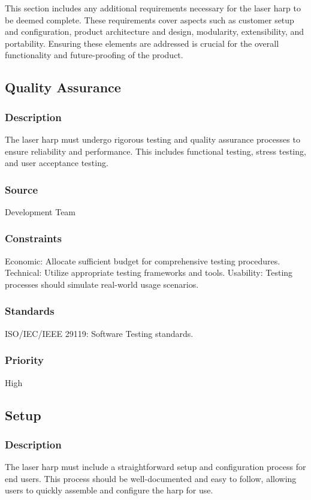 This section includes any additional requirements necessary for the laser harp to be deemed complete. These requirements cover aspects such as customer setup and configuration, product architecture and design, modularity, extensibility, and portability. Ensuring these elements are addressed is crucial for the overall functionality and future-proofing of the product.


\subsection{Quality Assurance}
\subsubsection{Description}
The laser harp must undergo rigorous testing and quality assurance processes to ensure reliability and performance. This includes functional testing, stress testing, and user acceptance testing.
\subsubsection{Source}
Development Team
\subsubsection{Constraints}
Economic: Allocate sufficient budget for comprehensive testing procedures.
Technical: Utilize appropriate testing frameworks and tools.
Usability: Testing processes should simulate real-world usage scenarios.
\subsubsection{Standards}
ISO/IEC/IEEE 29119: Software Testing standards.
\subsubsection{Priority}
High


\subsection{Setup}
\subsubsection{Description}
The laser harp must include a straightforward setup and configuration process for end users. This process should be well-documented and easy to follow, allowing users to quickly assemble and configure the harp for use.

